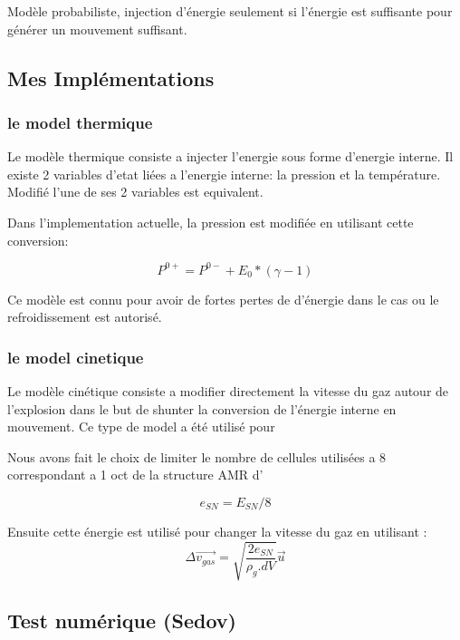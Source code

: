 Modèle probabiliste, injection d'énergie seulement si l'énergie est suffisante pour générer un mouvement suffisant.


\subsection{Mes Implémentations}


\subsubsection{le model thermique}
Le modèle thermique consiste a injecter l'energie sous forme d'energie interne.
Il existe 2 variables d'etat liées a l'energie interne: la pression et la température.
Modifié l'une de ses 2 variables est equivalent.

Dans l'implementation actuelle, la pression est modifiée en utilisant cette conversion:

\begin{equation}
P^{0+} = P^{0-}  + E_0 * (\gamma-1)
\end{equation}

Ce modèle est connu pour avoir de fortes pertes de d'énergie dans le cas ou le refroidissement est autorisé.


\subsubsection{le model cinetique}


Le modèle cinétique consiste a modifier directement la vitesse du gaz autour de l'explosion dans le but de shunter la conversion de l'énergie interne en mouvement.
Ce type de model a été utilisé pour 

Nous avons fait le choix de limiter le nombre de cellules utilisées a 8 correspondant a 1 oct de la structure AMR d'\emma

\begin{equation}
e_{SN} = E_{SN}/8
\end{equation}

Ensuite cette énergie est utilisé pour changer la vitesse du gaz en utilisant : 
\begin{equation}
    \Delta \overrightarrow{v_{gas}} = \sqrt{\frac{2e_{SN}}{\rho_g.dV}} \overrightarrow{u}
    \label{eq_sn_direct}
\end{equation}


\subsection{Test numérique (Sedov)}

